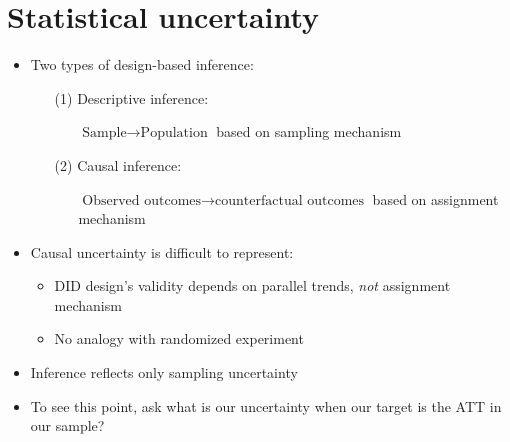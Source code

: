 \documentclass[table, xcolor={dvipsnames}, 9pt]{beamer}
\theoremstyle{newstyle}
\begin{document}
\section{Statistical uncertainty}
\begin{frame}{}
\begin{itemize}
\item Two types of design-based inference: 
\begin{enumerate}
\item[(1)] \pause  Descriptive inference:
\begin{itemize}
\item[] \pause $\text{Sample} \to \text{Population}$ based on sampling mechanism  
\end{itemize}
\item[(2)] \pause Causal inference: 
\begin{itemize}
\item[] \pause  $\text{Observed outcomes} \to \text{counterfactual outcomes}$ based on assignment mechanism 
\end{itemize}
\end{enumerate}	
\item \pause  Causal uncertainty is difficult to represent: 
\begin{itemize}
\item \pause DID design's validity depends on parallel trends, \textit{not} assignment mechanism  
\item No analogy with randomized experiment 
\end{itemize}	
\item Inference reflects only sampling uncertainty
\item To see this point, ask what is our uncertainty when our target is the ATT in our sample?
\end{itemize}
\end{frame}
\end{document}
